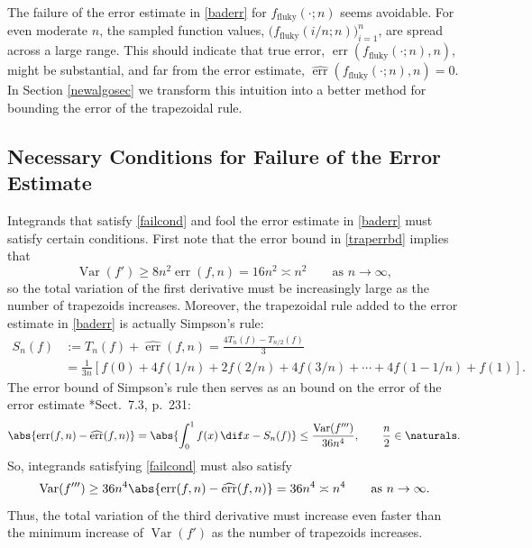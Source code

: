 \documentclass[]{amsart}
\DeclareMathOperator{\Var}{Var}
\DeclareMathOperator{\err}{err}
\newcommand{\herr}{\widehat{\err}}
\theoremstyle{definition}
\theoremstyle{remark}
\begin{document}
The failure of the error estimate in \eqref{baderr} for $f_{\text{fluky}}(\cdot;n)$ seems avoidable. For even moderate $n$, the sampled function values, $\bigl(f_{\text{fluky}}(i/n;n)\bigr)_{i=1}^{n}$, are spread across a large range.  This should indicate that true error, $\err(f_{\text{fluky}}(\cdot;n),n)$, might be substantial, and far from the error estimate, $\herr(f_{\text{fluky}}(\cdot;n),n)=0$.  In Section \ref{newalgosec} we transform this intuition into a better method for bounding the error of the trapezoidal rule.

\subsection{Necessary Conditions for Failure of the Error Estimate} 
Integrands that satisfy \eqref{failcond} and fool the error estimate in \eqref{baderr} must satisfy certain conditions.  First note that the error bound in \eqref{traperrbd} implies that
\[
\Var(f') \ge 8n^2 \err(f,n) =  16n^2 \asymp n^2 \qquad \text{as } n \to \infty,
\]
so the total variation of the first derivative must be increasingly large as the number of trapezoids increases.  Moreover, the trapezoidal rule added to the error estimate in \eqref{baderr} is actually Simpson's rule:
\begin{align*}
S_n(f) &:= T_n(f) + \herr(f,n) = \frac{4T_n(f) - T_{n/2}(f)}{3} \\
& = \frac{1}{3n} \left [ f(0) + 4 f(1/n) + 2 f(2/n) + 4 f(3/n) + \cdots + 4 f(1-1/n) + f(1) \right].
\end{align*}
The error bound of Simpson's rule then serves as an bound on the error of the error estimate \cite{BraPet11a}*{Sect.\ 7.3, p.\ 231}:
\begin{equation} \label{Simperrbd}
\abs{\err(f,n) - \herr(f,n)} = \abs{\int_0^1 f(x) \, \dif x - S_n(f)} \le \frac{\Var(f''')}{36n^4}, \qquad \frac{n}2 \in \naturals. 
\end{equation}
So, integrands satisfying \eqref{failcond} must also satisfy
\[
\Var(f''') \ge 36n^4 \abs{\err(f,n) - \herr(f,n)} =  36n^4 \asymp n^4 \qquad \text{as } n \to \infty.
\]
Thus, the total variation of the third derivative must increase even faster than the minimum increase of $\Var(f')$ as the number of trapezoids increases.
\end{document}
